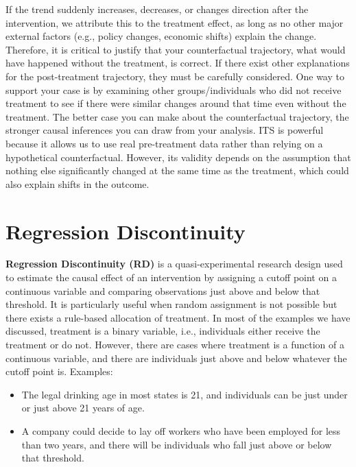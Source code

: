 \documentclass[
  letterpaper,
  DIV=11,
  numbers=noendperiod]{scrreprt}
\begin{document}
If the trend suddenly increases, decreases, or changes direction after
the intervention, we attribute this to the treatment effect, as long as
no other major external factors (e.g., policy changes, economic shifts)
explain the change. Therefore, it is critical to justify that your
counterfactual trajectory, what would have happened without the
treatment, is correct. If there exist other explanations for the
post-treatment trajectory, they must be carefully considered. One way to
support your case is by examining other groups/individuals who did not
receive treatment to see if there were similar changes around that time
even without the treatment. The better case you can make about the
counterfactual trajectory, the stronger causal inferences you can draw
from your analysis. ITS is powerful because it allows us to use real
pre-treatment data rather than relying on a hypothetical counterfactual.
However, its validity depends on the assumption that nothing else
significantly changed at the same time as the treatment, which could
also explain shifts in the outcome.

\section{Regression Discontinuity}\label{regression-discontinuity}

\textbf{Regression Discontinuity (RD)} is a quasi-experimental research
design used to estimate the causal effect of an intervention by
assigning a cutoff point on a continuous variable and comparing
observations just above and below that threshold. It is particularly
useful when random assignment is not possible but there exists a
rule-based allocation of treatment. In most of the examples we have
discussed, treatment is a binary variable, i.e., individuals either
receive the treatment or do not. However, there are cases where
treatment is a function of a continuous variable, and there are
individuals just above and below whatever the cutoff point is. Examples:

\begin{itemize}
\item
  The legal drinking age in most states is 21, and individuals can be
  just under or just above 21 years of age.
\item
  A company could decide to lay off workers who have been employed for
  less than two years, and there will be individuals who fall just above
  or below that threshold.
\end{itemize}
\end{document}
